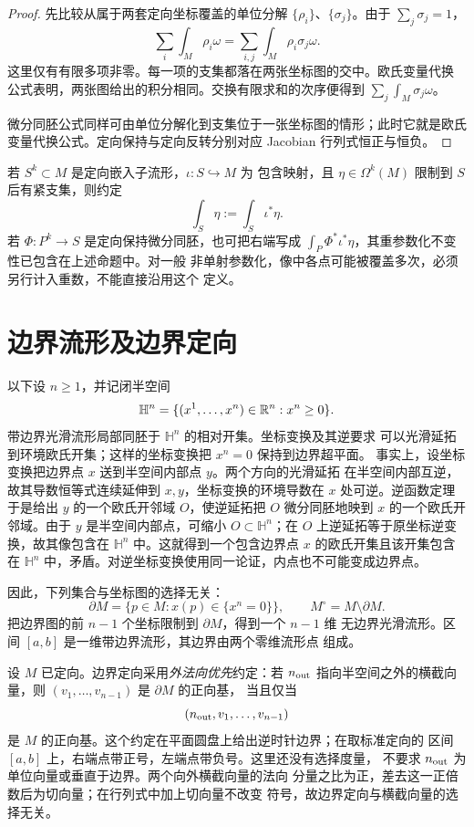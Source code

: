 \begin{proof}
先比较从属于两套定向坐标覆盖的单位分解
$\{\rho_i\}$、$\{\sigma_j\}$。由于 $\sum_j\sigma_j=1$，
\[
 \sum_i\int_M\rho_i\omega
 =\sum_{i,j}\int_M\rho_i\sigma_j\omega.
\]
这里仅有有限多项非零。每一项的支集都落在两张坐标图的交中。欧氏变量代换
公式表明，两张图给出的积分相同。交换有限求和的次序便得到
$\sum_j\int_M\sigma_j\omega$。

微分同胚公式同样可由单位分解化到支集位于一张坐标图的情形；此时它就是欧氏
变量代换公式。定向保持与定向反转分别对应 Jacobian 行列式恒正与恒负。
\end{proof}

若 $S^k\subset M$ 是定向嵌入子流形，$\iota:S\hookrightarrow M$ 为
包含映射，且 $\eta\in\Omega^k(M)$ 限制到 $S$ 后有紧支集，则约定
\[
 \int_S\eta:=\int_S\iota^*\eta.
\]
若 $\Phi:P^k\to S$ 是定向保持微分同胚，也可把右端写成
$\int_P\Phi^*\iota^*\eta$，其重参数化不变性已包含在上述命题中。对一般
非单射参数化，像中各点可能被覆盖多次，必须另行计入重数，不能直接沿用这个
定义。

\section{边界流形及边界定向}

以下设 $n\ge1$，并记闭半空间
\[
 \mathbb H^n=\{(x^1,\ldots,x^n)\in\mathbb{R}^n:x^n\ge0\}.
\]
带边界光滑流形局部同胚于 $\mathbb H^n$ 的相对开集。坐标变换及其逆要求
可以光滑延拓到环境欧氏开集；这样的坐标变换把 $x^n=0$ 保持到边界超平面。
事实上，设坐标变换把边界点 $x$ 送到半空间内部点 $y$。两个方向的光滑延拓
在半空间内部互逆，故其导数恒等式连续延伸到 $x,y$，坐标变换的环境导数在
$x$ 处可逆。逆函数定理于是给出 $y$ 的一个欧氏开邻域 $O$，使逆延拓把 $O$
微分同胚地映到 $x$ 的一个欧氏开邻域。由于 $y$ 是半空间内部点，可缩小
$O\subset\mathbb H^n$；在 $O$ 上逆延拓等于原坐标逆变换，故其像包含在
$\mathbb H^n$ 中。这就得到一个包含边界点 $x$ 的欧氏开集且该开集包含在
$\mathbb H^n$ 中，矛盾。对逆坐标变换使用同一论证，内点也不可能变成边界点。

因此，下列集合与坐标图的选择无关：
\[
 \partial M=\{p\in M:x(p)\in\{x^n=0\}\},
 \qquad M^\circ=M\setminus\partial M.
\]
把边界图的前 $n-1$ 个坐标限制到 $\partial M$，得到一个 $n-1$ 维
无边界光滑流形。区间 $[a,b]$ 是一维带边界流形，其边界由两个零维流形点
组成。

设 $M$ 已定向。边界定向采用\emph{外法向优先}约定：若 $n_{\rm out}$
指向半空间之外的横截向量，则 $(v_1,\ldots,v_{n-1})$ 是 $\partial M$ 的正向基，
当且仅当
\[
 (n_{\rm out},v_1,\ldots,v_{n-1})
\]
是 $M$ 的正向基。这个约定在平面圆盘上给出逆时针边界；在取标准定向的
区间 $[a,b]$ 上，右端点带正号，左端点带负号。这里还没有选择度量，
不要求 $n_{\rm out}$ 为单位向量或垂直于边界。两个向外横截向量的法向
分量之比为正，差去这一正倍数后为切向量；在行列式中加上切向量不改变
符号，故边界定向与横截向量的选择无关。

